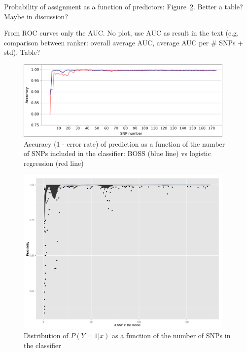 Probability of assignment as a function of predictors:
Figure~\ref{fig:probability}. Better a table? Maybe in discussion?

From ROC curves only the AUC. No plot, use AUC as result in the text (e.g.
comparison between ranker: overall average AUC, average AUC per \# SNPs
+ std). Table?

\begin{figure}
\includegraphics[width=0.95\textwidth]{accuracy.pdf}
\caption{Accuracy (1 - error rate) of prediction as a function of the
  number of SNPs included in the classifier: BOSS (blue line) vs
  logistic regression (red line)}
\label{fig:accuracy}       %
\end{figure}

\begin{figure}
\includegraphics[width=0.95\textwidth]{probabilities.pdf}
\caption{Distribution of $P(Y=1|x)$ as a function of the number of SNPs
  in the classifier}
\label{fig:probability} 
\end{figure}


